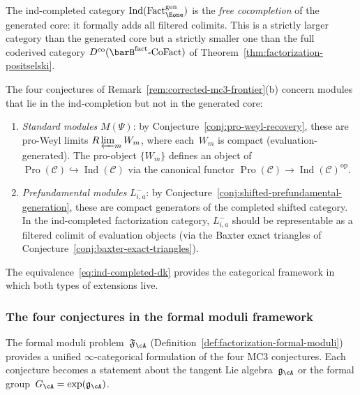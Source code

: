 \begin{remark}
\label{rem:ind-vs-proweyl}
The ind-completed category
$\operatorname{Ind}(\operatorname{Fact}_{\Eone}^{\mathrm{gen}})$
is the \emph{free cocompletion} of the generated core: it
formally adds all filtered colimits.  This is a strictly larger
category than the generated core but a strictly smaller one than
the full coderived category
$D^{\mathrm{co}}(\barB^{\mathrm{fact}}\text{-}\mathrm{CoFact})$
of Theorem~\ref{thm:factorization-positselski}.

The four conjectures of
Remark~\ref{rem:corrected-mc3-frontier}(b) concern modules
that lie in the ind-completion but not in the generated core:
\begin{enumerate}[label=\textup{(\alph*)}]
\item \emph{Standard modules} $M(\Psi)$: by
  Conjecture~\ref{conj:pro-weyl-recovery}, these are
  pro-Weyl limits $R\varprojlim_m W_m$, where each~$W_m$ is
  compact (evaluation-generated).  The pro-object
  $\{W_m\}$ defines an object of $\operatorname{Pro}(\mathcal{C})
  \hookrightarrow \operatorname{Ind}(\mathcal{C})$
  via the canonical functor
  $\operatorname{Pro}(\mathcal{C}) \to
  \operatorname{Ind}(\mathcal{C})^{\mathrm{op}}$.
\item \emph{Prefundamental modules} $L^-_{i,a}$: by
  Conjecture~\ref{conj:shifted-prefundamental-generation}, these
  are compact generators of the completed shifted category.
  In the ind-completed factorization category, $L^-_{i,a}$
  should be representable as a filtered colimit of evaluation
  objects (via the Baxter exact triangles of
  Conjecture~\ref{conj:baxter-exact-triangles}).
\end{enumerate}
The equivalence~\eqref{eq:ind-completed-dk} provides the
categorical framework in which both types of extensions live.
\end{remark}

\subsubsection*{The four conjectures in the formal moduli framework}

The formal moduli problem~$\mathfrak{F}_{\cA}$
(Definition~\ref{def:factorization-formal-moduli}) provides a
unified $\infty$-categorical formulation of the four MC3
conjectures.  Each conjecture becomes a statement about the
tangent Lie algebra~$\mathfrak{g}_{\cA}$ or the formal
group~$G_{\cA} = \exp(\mathfrak{g}_{\cA})$.

